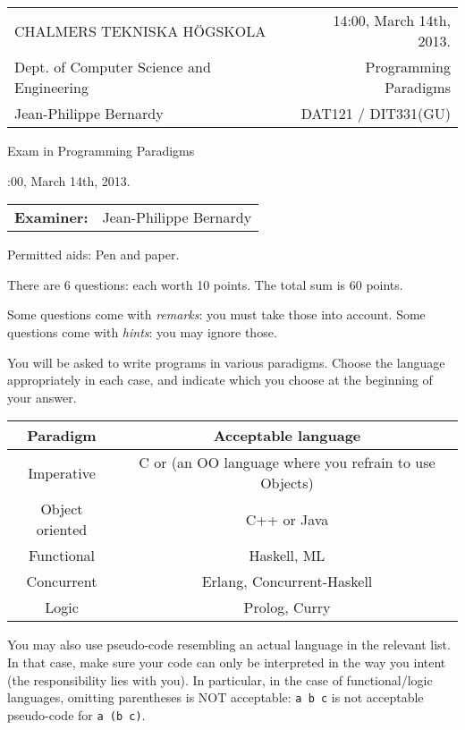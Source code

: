 \documentclass{article}
\begin{document}
\setlength{\parskip}{2pt}

\newcommand{\examtime}{14:00, March 14th, 2013}
\newcommand{\points}[1]{\marginpar{\bf #1 points}}
\noindent
\begin{tabular}{lr}
CHALMERS TEKNISKA H\"OGSKOLA &\examtime{}.\\
Dept. of Computer Science and Engineering & Programming Paradigms\\
Jean-Philippe Bernardy                 & DAT121 / DIT331(GU) \\
\end{tabular}

\vspace{2.5cm} \noindent
\begin{center} {\LARGE
Exam in Programming Paradigms}
\end{center}

\vspace{1.5cm}

\noindent
\examtime{}.\\
\begin{tabular}{ll}
\textbf{Examiner:} & Jean-Philippe Bernardy
\end{tabular}
\vspace{1cm}

\noindent
Permitted aids: Pen and paper.

There are 6 questions: each worth 10 points. The total sum is 60
points.

Some questions come with \emph{remarks}: you must take those
into account.  
Some questions come with \emph{hints}: you may ignore those.

You will be asked to write programs in various paradigms. Choose the
language appropriately in each case, and indicate which you choose at
the beginning of your answer.

\begin{tabular}[p]{cc}
  Paradigm & Acceptable language \\ \hline
  Imperative   & C or (an OO language where you refrain to use Objects) \\
  Object oriented & C++ or Java \\
  Functional & Haskell, ML \\
  Concurrent & Erlang, Concurrent-Haskell \\
  Logic & Prolog, Curry
\end{tabular}

You may also use pseudo-code resembling an actual language in the
relevant list. In that case, make sure your code can only be
interpreted in the way you intent (the responsibility lies with
you). In particular, in the case of functional/logic languages,
omitting parentheses is NOT acceptable: \texttt{a b c} is not
acceptable pseudo-code for \texttt{a (b c)}.
\end{document}
